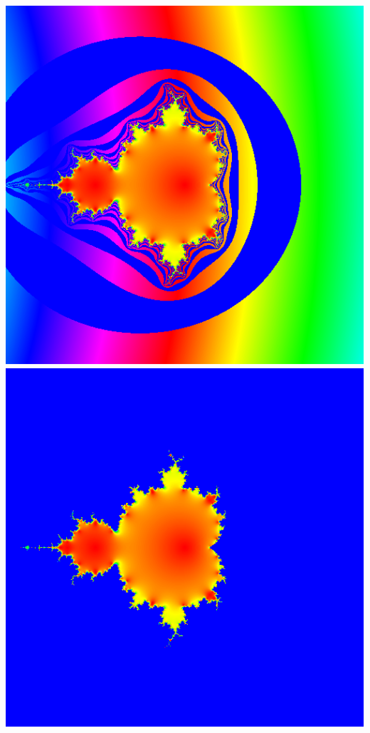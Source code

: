 \documentclass[../resume.tex]{subfiles}
\begin{document}
\noindent
\includegraphics[scale=0.15]{../TAing/mandel/5.png}
\includegraphics[scale=0.15]{../TAing/mandel/6.png}
\end{document}
